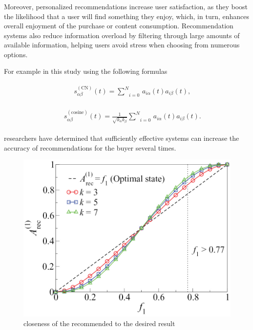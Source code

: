 \documentclass[10pt,twoside,slovak,a4paper]{article}
\begin{document}
Moreover, personalized recommendations increase user satisfaction, as they boost the likelihood that a user will find something they enjoy, which, in turn, enhances overall enjoyment of the purchase or content consumption. Recommendation systems also reduce information overload by filtering through large amounts of available information, helping users avoid stress when choosing from numerous options.

For example in this study \cite{closeness}using the following formulas

\begin{eqnarray}
    &&\begin{array}{*{35}{l}}
        s_{\alpha \beta}^{\left(\text{CN}\right)}(t)=\underset{i=0}{\overset{N}{\sum}}\,{{a}_{i\alpha}}(t){{a}_{i\beta}}(t), 
    \end{array}
\end{eqnarray}

\begin{eqnarray}
    &&\begin{array}{*{35}{l}}
        s_{\alpha \beta}^{\left(\text{cosine}\right)}(t)=\frac{1}{\sqrt{{{k}_{\alpha}}{{k}_{\beta}}}}\underset{i=0}{\overset{N}{\sum}}\,{{a}_{i\alpha}}(t){{a}_{i\beta}}(t). 
    \end{array}
\end{eqnarray}

researchers have determined that
sufficiently effective systems can increase the accuracy of recommendations for the buyer several times.
\begin{figure}[!h]
    \centering
    \includegraphics[width=0.9\linewidth]{picture.jpg}
    \caption{closeness of the recommended to the desired result}
    \label{fig:closeness}
\end{figure}
\end{document}
